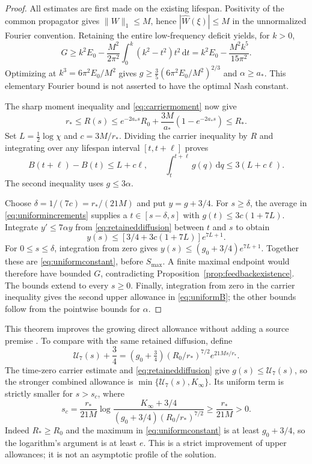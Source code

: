 \documentclass[11pt]{article}
\numberwithin{equation}{section}
\newcommand{\dd}{\,\mathrm d}
\begin{document}
\begin{proof}
All estimates are first made on the existing lifespan. Positivity of
the common propagator gives $\|W\|_1\le M$, hence
$|\widehat W(\xi)|\le M$ in the unnormalized Fourier convention.
Retaining the entire low-frequency deficit yields, for $k>0$,
\[
 G\ge k^2E_0-\frac{M^2}{2\pi^2}
          \int_0^k(k^2-t^2)t^2\dd t
   =k^2E_0-\frac{M^2k^5}{15\pi^2}.
\]
Optimizing at $k^3=6\pi^2E_0/M^2$ gives
$g\ge\frac35(6\pi^2E_0/M^2)^{2/3}$ and $\alpha\ge a_*$.
This elementary Fourier bound is not asserted to have the optimal
Nash constant.

The sharp moment inequality and \eqref{eq:carriermoment} now give
\begin{equation}\label{eq:uniformmoment}
 r_*\le R(s)\le e^{-2a_*s}R_0+
       \frac{3M}{a_*}(1-e^{-2a_*s})\le R_*.
\end{equation}
Set $L=\frac12\log\chi$ and $c=3M/r_*$. Dividing the carrier
inequality by $R$ and integrating over any lifespan interval
$[t,t+\ell]$ proves
\begin{equation}\label{eq:uniformincrements}
 B(t+\ell)-B(t)\le L+c\ell,\qquad
 \int_t^{t+\ell}g(q)\dd q\le3(L+c\ell).
\end{equation}
The second inequality uses $g\le3\alpha$.

Choose $\delta=1/(7c)=r_*/(21M)$ and put $y=g+3/4$.
For $s\ge\delta$, the average in \eqref{eq:uniformincrements}
supplies a $t\in[s-\delta,s]$ with $g(t)\le3c(1+7L)$.
Integrate $y'\le7\alpha y$ from \eqref{eq:retaineddiffusion} between
$t$ and $s$ to obtain
\[
 y(s)\le[3/4+3c(1+7L)]e^{7L+1}.
\]
For $0\le s\le\delta$, integration from zero gives
$y(s)\le(g_0+3/4)e^{7L+1}$. Together these are
\eqref{eq:uniformconstant}, before $S_{\max}$.
A finite maximal endpoint would therefore have bounded $G$,
contradicting Proposition~\ref{prop:feedbackexistence}.
The bounds extend to every $s\ge0$.
Finally, integration from zero in the carrier inequality gives
the second upper allowance in \eqref{eq:uniformB}; the other
bounds follow from the pointwise bounds for $\alpha$.
\end{proof}

This theorem improves the growing direct allowance without adding a
source premise \cite{UniformFeedbackNote}. To compare with the same
retained diffusion, define
\begin{equation}\label{eq:directgrowing}
 \mathcal U_7(s)+\frac34
  =(g_0+\tfrac34)(R_0/r_*)^{7/2}e^{21Ms/r_*}.
\end{equation}
The time-zero carrier estimate and \eqref{eq:retaineddiffusion}
give $g(s)\le\mathcal U_7(s)$, so the stronger combined allowance is
$\min\{\mathcal U_7(s),K_\infty\}$. Its uniform term is strictly
smaller for $s>s_c$, where
\begin{equation}\label{eq:uniformcrossing}
 s_c=\frac{r_*}{21M}
 \log\frac{K_\infty+3/4}
 {(g_0+3/4)(R_0/r_*)^{7/2}}\ge\frac{r_*}{21M}>0.
\end{equation}
Indeed $R_*\ge R_0$ and the maximum in
\eqref{eq:uniformconstant} is at least $g_0+3/4$, so the logarithm's
argument is at least $e$. This is a strict improvement of upper
allowances; it is not an asymptotic profile of the solution.
\end{document}
